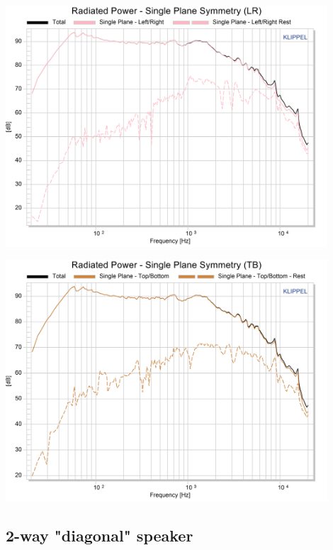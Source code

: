 \documentclass{report}
\begin{document}
\begin{appendices}
\begin{minipage}{0.5\textwidth}
\begin{center}
	\includegraphics[width=0.9\textwidth]{Sym/Oval_RadPow_SpsLR}
    \captionsetup{hypcap=false}
\end{center}
\end{minipage}
\begin{minipage}{0.5\textwidth}
\begin{center}
	\includegraphics[width=0.9\textwidth]{Sym/Oval_RadPow_SpsTB}
    \captionsetup{hypcap=false}
\end{center}
\end{minipage}

\subsection{2-way "diagonal" speaker}
\label{Curves:2way}


\end{appendices}
\end{document}
